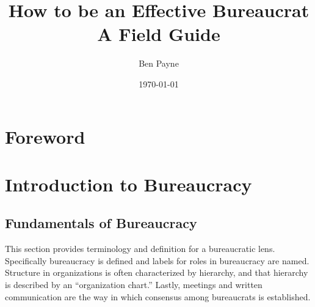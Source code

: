 \documentclass{book}
\title{How to be an Effective Bureaucrat\\
A Field Guide}
\author{Ben Payne}
\date{\today}
\begin{document}

\begin{titlepage}
\maketitle
\thispagestyle{empty}
\end{titlepage}
\newpage

\frontmatter %

\clearpage

\chapter*{Foreword}%

\hypertarget{contents}{}
\tableofcontents

\mainmatter %


\chapter{Introduction to Bureaucracy}

  \newpage %
  
  \section{Fundamentals of Bureaucracy\label{fundamentals_of_b}}
  
  This section provides terminology and definition for a bureaucratic lens. Specifically bureaucracy is defined and labels for roles in bureaucracy are named. Structure in organizations is often characterized by hierarchy, and that hierarchy is described by an ``organization chart.'' Lastly, meetings and written communication are the way in which consensus among bureaucrats is established.

    
    
    
    
  \newpage
  \newpage %
\end{document}
